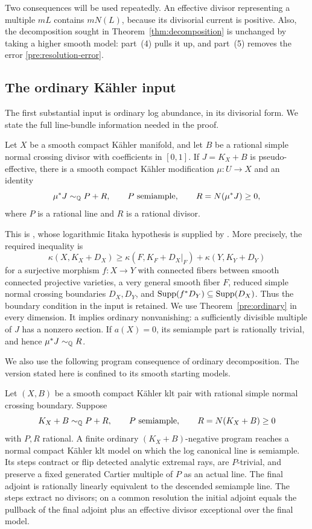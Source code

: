 Two consequences will be used repeatedly. An effective divisor
representing a multiple \(mL\) contains \(mN(L)\), because its divisorial
current is positive. Also, the decomposition sought in
Theorem~\ref{thm:decomposition} is unchanged by taking a higher smooth
model: part~(4) pulls it up, and part~(5) removes the error
\eqref{pre:resolution-error}.

\subsection{The ordinary K\"ahler input}

The first substantial input is ordinary log abundance, in its
divisorial form. We state the full line-bundle information needed
in the proof.

\begin{theorem}\label{pre:ordinary}
Let \(X\) be a smooth compact K\"ahler manifold, and let \(B\) be a
rational simple normal crossing divisor with coefficients in \([0,1]\).
If \(J=K_X+B\) is pseudo-effective, there is a smooth compact K\"ahler
modification \(\mu:U\to X\) and an identity
\[
 \mu^*J\sim_{\mathbb Q} P+R,\qquad P\text{ semiample},\qquad
 R=N(\mu^*J)\geq0,
\]
where \(P\) is a rational line and \(R\) is a rational divisor.
\end{theorem}

This is \cite[Theorem~2.13]{K}, whose logarithmic Iitaka hypothesis is
supplied by \cite[Corollary~6.2]{LI}. More precisely, the required inequality
is
\[
 \kappa(X,K_X+D_X)\geq
 \kappa(F,K_F+D_X|_F)+\kappa(Y,K_Y+D_Y)
\]
for a surjective morphism \(f:X\to Y\) with connected fibers between
smooth connected projective varieties, a very general smooth fiber
\(F\), reduced simple normal crossing boundaries \(D_X,D_Y\), and
\(\operatorname{Supp}(f^*D_Y)\subseteq\operatorname{Supp}(D_X)\). Thus the boundary condition in
the input is retained. We use Theorem~\ref{pre:ordinary} in every
dimension. It implies ordinary nonvanishing: a sufficiently divisible
multiple of \(J\) has a nonzero section. If \(a(X)=0\), its semiample
part is rationally trivial, and hence \(\mu^*J\sim_{\mathbb Q} R\).

We also use the following program consequence of ordinary decomposition.
The version stated here is confined to its smooth starting models.

\begin{proposition}\label{pre:contract}
Let \((X,B)\) be a smooth compact K\"ahler klt pair with rational
simple normal crossing boundary. Suppose
\[
 K_X+B\sim_{\mathbb Q} P+R,\qquad P\text{ semiample},\qquad
 R=N(K_X+B)\geq0
\]
with \(P,R\) rational. A finite ordinary \((K_X+B)\)-negative program
reaches a normal compact K\"ahler klt model on which the log canonical
line is semiample. Its steps contract or flip detected analytic extremal
rays, are \(P\)-trivial, and preserve a fixed generated Cartier multiple
of \(P\) as an actual line. The final adjoint is rationally linearly
equivalent to the descended semiample line. The steps extract no
divisors; on a common resolution the initial adjoint equals the
pullback of the final adjoint plus an effective divisor exceptional
over the final model.
\end{proposition}

